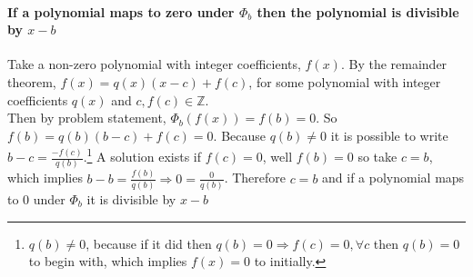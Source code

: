 \documentclass[12pt]{article}
\begin{document}
\paragraph*{If a polynomial maps to zero under $\Phi_b$ then the polynomial is divisible by $x-b$}
Take a non-zero polynomial with integer coefficients, $f(x)$. By the remainder theorem, $f(x)=q(x)(x-c) + f(c)$, for some polynomial with integer coefficients $q(x)$ and $c, f(c) \in \mathbb{Z}$.\\

 Then by problem statement, $\Phi_b(f(x)) = f(b) = 0 $.  So $f(b) = q(b)(b-c) + f(c) = 0$. Because $q(b) \neq 0$ it is possible to write $b-c = \frac{-f(c)}{q(b)}$.\footnote{$q(b) \neq 0$, because if it did then $q(b) = 0 \Rightarrow f(c) = 0, \forall c$ then $q(b) = 0$ to begin with, which implies $f(x) = 0$ to initially.}  A solution exists if $f(c)=0$, well $f(b)=0$ so take $c=b$, which implies $b-b = \frac{f(b)}{q(b)} \Rightarrow 0 = \frac{0}{q(b)}$.  Therefore $c=b$ and if a polynomial maps to 0 under $\Phi_b$ it is divisible by $x-b$
\end{document}
